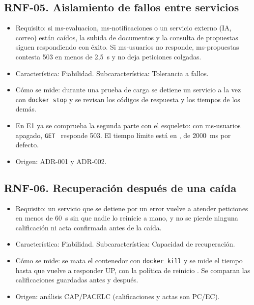 \subsection*{RNF-05. Aislamiento de fallos entre servicios}
\begin{itemize}
  \item Requisito: si ms-evaluacion, ms-notificaciones o un servicio externo (IA, correo) están caídos, la subida de documentos y la consulta de propuestas siguen respondiendo con éxito. Si ms-usuarios no responde, ms-propuestas contesta 503 en menos de 2,5~s y no deja peticiones colgadas.
  \item Característica: Fiabilidad. Subcaracterística: Tolerancia a fallos.
  \item Cómo se mide: durante una prueba de carga se detiene un servicio a la vez con \texttt{docker stop} y se revisan los códigos de respuesta y los tiempos de los demás.
  \item En E1 ya se comprueba la segunda parte con el esqueleto: con ms-usuarios apagado, \texttt{GET}~ responde 503. El tiempo límite está en , de 2000~ms por defecto.
  \item Origen: ADR-001 y ADR-002.
\end{itemize}

\subsection*{RNF-06. Recuperación después de una caída}
\begin{itemize}
  \item Requisito: un servicio que se detiene por un error vuelve a atender peticiones en menos de 60~s sin que nadie lo reinicie a mano, y no se pierde ninguna calificación ni acta confirmada antes de la caída.
  \item Característica: Fiabilidad. Subcaracterística: Capacidad de recuperación.
  \item Cómo se mide: se mata el contenedor con \texttt{docker kill} y se mide el tiempo hasta que  vuelve a responder UP, con la política de reinicio . Se comparan las calificaciones guardadas antes y después.
  \item Origen: análisis CAP/PACELC (calificaciones y actas son PC/EC).
\end{itemize}

